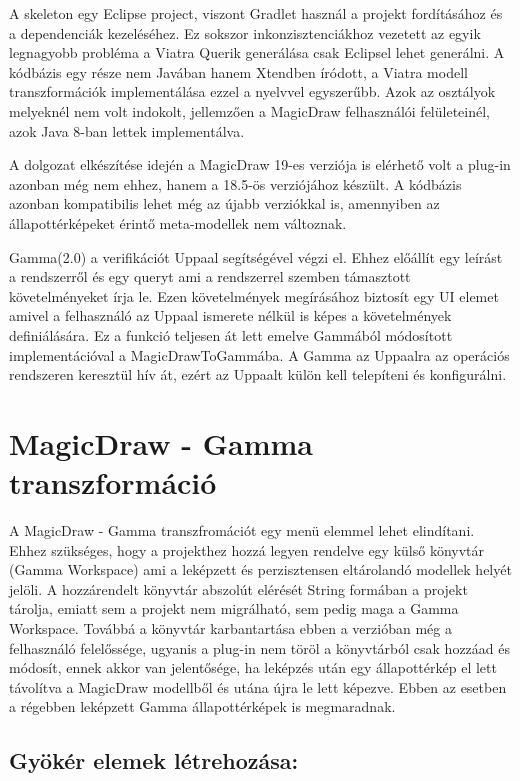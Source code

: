 A skeleton egy Eclipse project, viszont Gradlet használ a projekt fordításához és a dependenciák kezeléséhez. Ez sokszor inkonzisztenciákhoz vezetett az egyik legnagyobb probléma a Viatra Querik generálása csak Eclipsel lehet generálni. A kódbázis egy része nem Javában hanem Xtendben íródott, a Viatra modell transzformációk implementálása ezzel a nyelvvel egyszerűbb. Azok az osztályok melyeknél nem volt indokolt, jellemzően a MagicDraw felhasználói felületeinél, azok Java 8-ban lettek implementálva.

A dolgozat elkészítése idején a MagicDraw 19-es verziója is elérhető volt a plug-in azonban még nem ehhez, hanem a 18.5-ös verziójához készült. A kódbázis azonban kompatibilis lehet még az újabb verziókkal is, amennyiben az állapottérképeket érintő meta-modellek nem változnak.

Gamma(2.0) a verifikációt Uppaal segítségével végzi el. Ehhez előállít egy leírást a rendszerről és egy queryt ami a rendszerrel szemben támasztott követelményeket írja le. Ezen követelmények megírásához biztosít egy UI elemet amivel a felhasználó az Uppaal ismerete nélkül is képes a követelmények definiálására. Ez a funkció teljesen át lett emelve Gammából módosított implementációval a MagicDrawToGammába. A Gamma az Uppaalra az operációs rendszeren keresztül hív át, ezért az Uppaalt külön kell telepíteni és konfigurálni.

\section{MagicDraw - Gamma transzformáció}

A MagicDraw - Gamma transzfromációt egy menü elemmel lehet elindítani. Ehhez szükséges, hogy a projekthez hozzá legyen rendelve egy külső könyvtár (Gamma Workspace) ami a leképzett és perzisztensen eltárolandó modellek helyét jelöli. A hozzárendelt könyvtár abszolút elérését String formában a projekt tárolja, emiatt sem a projekt nem migrálható, sem pedig maga a Gamma Workspace. Továbbá a könyvtár karbantartása ebben a verzióban még a felhasználó felelőssége, ugyanis a plug-in nem töröl a könyvtárból csak hozzáad és módosít, ennek akkor van jelentősége, ha leképzés után egy állapottérkép el lett távolítva a MagicDraw modellből és utána újra le lett képezve. Ebben az esetben a régebben leképzett Gamma állapottérképek is megmaradnak.

\subsection{Gyökér elemek létrehozása:}

